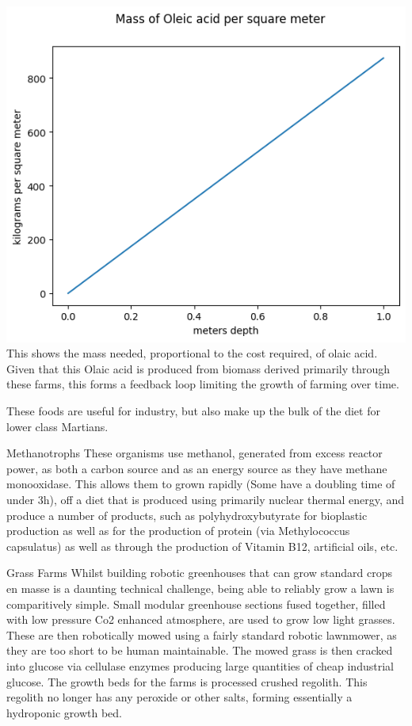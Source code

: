 \documentclass[10pt]{article}
\begin{document}
\includegraphics{fig_mass.png}
This shows the mass needed, proportional to the cost required, of olaic acid. Given that this Olaic acid is produced from biomass derived primarily through these farms, this forms a feedback loop limiting the growth of farming over time.


These foods are useful for industry, but also make up the bulk of the diet for lower class Martians.

Methanotrophs
These organisms use methanol, generated from excess reactor power, as both a carbon source and as an energy source as they have methane monooxidase. This allows them to grown rapidly (Some have a doubling time of under 3h), off a diet that is produced using primarily nuclear thermal energy, and produce a number of products, such as polyhydroxybutyrate for bioplastic production as well as for the production of protein (via Methylococcus capsulatus) as well as through the production of Vitamin B12, artificial oils, etc.

Grass Farms
Whilst building robotic greenhouses that can grow standard crops en masse is a daunting technical challenge, being able to reliably grow a lawn is comparitively simple. Small modular greenhouse sections fused together, filled with low pressure Co2 enhanced atmosphere, are used to grow low light grasses. These are then robotically mowed using a fairly standard robotic lawnmower, as they are too short to be human maintainable. The mowed grass is then cracked into glucose via cellulase enzymes producing large quantities of cheap industrial glucose. The growth beds for the farms is processed crushed regolith. This regolith no longer has any peroxide or other salts, forming essentially a hydroponic growth bed.
\end{document}
